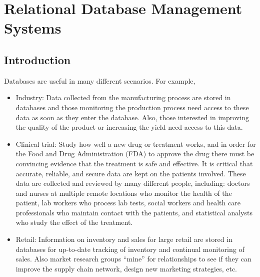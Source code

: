 

\chapter{Relational Database Management Systems}\label{chap:dbms}
 

\section{Introduction}

Databases are useful in many different scenarios.
For example, 
\begin{itemize}
\item Industry: Data collected from the manufacturing process are stored in
databases and those monitoring the production process need access to these
data as soon as they enter the database.  Also, those interested in improving
the quality of the product or increasing the yield need access to this data.

\item Clinical trial: Study how well a new drug or treatment works, and
in order for the Food and Drug Administration (FDA) to approve the drug
there must be convincing evidence that the treatment is safe and effective.
It is critical that accurate, reliable, and secure data are kept on
the patients involved.
These data are collected and reviewed by many different people, including:
doctors and nurses at multiple remote locations who monitor the health of the
patient, lab workers who process lab tests, social workers and
health care professionals who maintain contact with the patients,
and statistical analysts who study the effect of the treatment.

\item Retail: Information on inventory and sales for large retail
are stored in databases for up-to-date tracking of inventory and continual
monitoring of sales. 
Also market research groups ``mine'' for relationships to see if they 
can improve the supply chain network, design new marketing strategies, etc.
\end{itemize}

